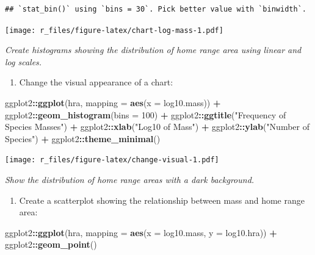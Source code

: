 \documentclass[]{Nemilov}
\newenvironment{Shaded}{\begin{snugshade}}{\end{snugshade}}
\newcommand{\DataTypeTok}[1]{\textcolor[rgb]{0.13,0.29,0.53}{#1}}
\newcommand{\DecValTok}[1]{\textcolor[rgb]{0.00,0.00,0.81}{#1}}
\newcommand{\KeywordTok}[1]{\textcolor[rgb]{0.13,0.29,0.53}{\textbf{#1}}}
\newcommand{\NormalTok}[1]{#1}
\newcommand{\OperatorTok}[1]{\textcolor[rgb]{0.81,0.36,0.00}{\textbf{#1}}}
\newcommand{\StringTok}[1]{\textcolor[rgb]{0.31,0.60,0.02}{#1}}
\providecommand{\tightlist}{%
  \setlength{\itemsep}{0pt}\setlength{\parskip}{0pt}}
\begin{document}
\begin{verbatim}
## `stat_bin()` using `bins = 30`. Pick better value with `binwidth`.
\end{verbatim}

\texttt{[image: r\_files/figure-latex/chart-log-mass-1.pdf]}

\emph{Create histograms showing the distribution of home range area using linear and log scales.}

\begin{enumerate}
\def\labelenumi{\arabic{enumi}.}
\setcounter{enumi}{1}
\tightlist
\item
  Change the visual appearance of a chart:
\end{enumerate}

\begin{Shaded}
\begin{Highlighting}[]
\NormalTok{ggplot2}\OperatorTok{::}\KeywordTok{ggplot}\NormalTok{(hra, }\DataTypeTok{mapping =} \KeywordTok{aes}\NormalTok{(}\DataTypeTok{x =}\NormalTok{ log10.mass)) }\OperatorTok{+}
\StringTok{  }\NormalTok{ggplot2}\OperatorTok{::}\KeywordTok{geom_histogram}\NormalTok{(}\DataTypeTok{bins =} \DecValTok{100}\NormalTok{) }\OperatorTok{+}
\StringTok{  }\NormalTok{ggplot2}\OperatorTok{::}\KeywordTok{ggtitle}\NormalTok{(}\StringTok{"Frequency of Species Masses"}\NormalTok{) }\OperatorTok{+}
\StringTok{  }\NormalTok{ggplot2}\OperatorTok{::}\KeywordTok{xlab}\NormalTok{(}\StringTok{"Log10 of Mass"}\NormalTok{) }\OperatorTok{+}
\StringTok{  }\NormalTok{ggplot2}\OperatorTok{::}\KeywordTok{ylab}\NormalTok{(}\StringTok{"Number of Species"}\NormalTok{) }\OperatorTok{+}
\StringTok{  }\NormalTok{ggplot2}\OperatorTok{::}\KeywordTok{theme_minimal}\NormalTok{()}
\end{Highlighting}
\end{Shaded}

\texttt{[image: r\_files/figure-latex/change-visual-1.pdf]}

\emph{Show the distribution of home range areas with a dark background.}

\begin{enumerate}
\def\labelenumi{\arabic{enumi}.}
\setcounter{enumi}{2}
\tightlist
\item
  Create a scatterplot showing the relationship between mass and home range area:
\end{enumerate}

\begin{Shaded}
\begin{Highlighting}[]
\NormalTok{ggplot2}\OperatorTok{::}\KeywordTok{ggplot}\NormalTok{(hra, }\DataTypeTok{mapping =} \KeywordTok{aes}\NormalTok{(}\DataTypeTok{x =}\NormalTok{ log10.mass, }\DataTypeTok{y =}\NormalTok{ log10.hra)) }\OperatorTok{+}
\StringTok{  }\NormalTok{ggplot2}\OperatorTok{::}\KeywordTok{geom_point}\NormalTok{()}
\end{Highlighting}
\end{Shaded}
\end{document}
